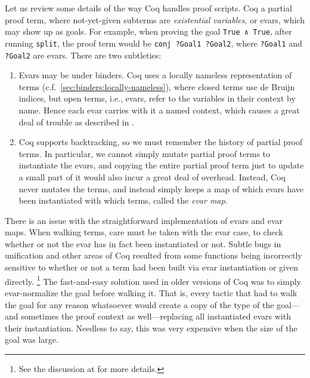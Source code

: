 Let us review some details of the way Coq handles proof scripts.
Coq a partial proof term, where not-yet-given subterms are \emph{existential variables}, or evars, which may show up as goals.
For example, when proving the goal \texttt{True ∧ True}, after running \texttt{split}, the proof term would be \texttt{conj ?Goal1 ?Goal2}, where \texttt{?Goal1} and \texttt{?Goal2} are evars.
There are two subtleties:
\begin{enumerate}
\item
  Evars may be under binders.
  Coq uses a locally nameless representation of terms (c.f.~\autoref{sec:binders:locally-nameless}), where closed terms use de Bruijn indices, but open terms, i.e., evars, refer to the variables in their context by name.
  Hence each evar carries with it a named context, which causes a great deal of trouble as described in .
\item
  Coq supports backtracking, so we must remember the history of partial proof terms.
  In particular, we cannot simply mutate partial proof terms to instantiate the evars, and copying the entire partial proof term just to update a small part of it would also incur a great deal of overhead.
  Instead, Coq never mutates the terms, and instead simply keeps a map of which evars have been instantiated with which terms, called the \emph{evar map}.
\end{enumerate}

There is an issue with the straightforward implementation of evars and evar maps.
When walking terms, care must be taken with the evar case, to check whether or not the evar has in fact been instantiated or not.
Subtle bugs in unification and other areas of Coq resulted from some functions being incorrectly sensitive to whether or not a term had been built via evar instantiation or given directly.%
\footnote{%
  See the discussion at \textcite{coq-pr-econstr} for more details.%
}
The fast-and-easy solution used in older versions of Coq was to simply evar-normalize the goal before walking it.
That is, every tactic that had to walk the goal for any reason whatsoever would create a copy of the type of the goal---and sometimes the proof context as well---replacing all instantiated evars with their instantiation.
Needless to say, this was very expensive when the size of the goal was large.


